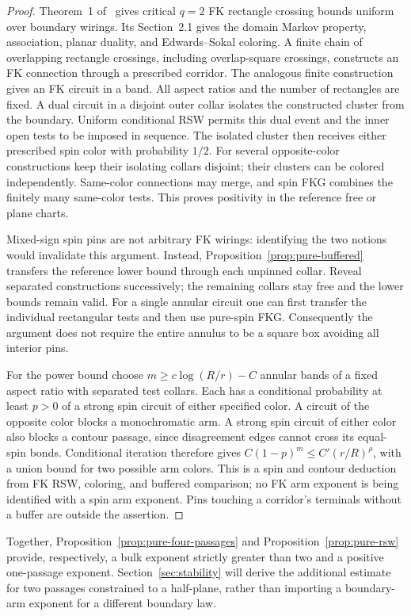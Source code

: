 \begin{proof}
Theorem~1 of~\cite{DHN2011} gives critical \(q=2\) FK rectangle
crossing bounds uniform over boundary wirings. Its Section~2.1 gives
the domain Markov property, association, planar duality, and
Edwards--Sokal coloring. A finite chain of overlapping rectangle
crossings, including overlap-square crossings, constructs an FK
connection through a prescribed corridor. The analogous finite
construction gives an FK circuit in a band. All aspect ratios and
the number of rectangles are fixed. A dual circuit in a disjoint
outer collar isolates the constructed cluster from the boundary.
Uniform conditional RSW permits this dual event and the inner open
tests to be imposed in sequence. The isolated cluster then receives
either prescribed spin color with probability \(1/2\). For several
opposite-color constructions keep their isolating collars disjoint;
their clusters can be colored independently. Same-color connections
may merge, and spin FKG combines the finitely many same-color tests.
This proves positivity in the reference free or plane charts.

Mixed-sign spin pins are not arbitrary FK wirings: identifying the
two notions would invalidate this argument. Instead,
Proposition~\ref{prop:pure-buffered} transfers the reference lower
bound through each unpinned collar. Reveal separated constructions
successively; the remaining collars stay free and the lower bounds
remain valid. For a single annular circuit one can first transfer the
individual rectangular tests and then use pure-spin FKG. Consequently
the argument does not require the entire annulus to be a square box
avoiding all interior pins.

For the power bound choose \(m\ge c\log(R/r)-C\) annular bands of
a fixed aspect ratio with separated test collars. Each has a
conditional probability at least \(p>0\) of a strong spin circuit
of either specified color. A circuit of the opposite color blocks a
monochromatic arm. A strong spin circuit of either color also blocks
a contour passage, since disagreement edges cannot cross its
equal-spin bonds. Conditional iteration therefore gives
\(C(1-p)^m\le C'(r/R)^\rho\), with a union bound for two possible
arm colors. This is a spin and contour deduction from FK RSW,
coloring, and buffered comparison; no FK arm exponent is being
identified with a spin arm exponent. Pins touching a corridor's
terminals without a buffer are outside the assertion.
\end{proof}

Together, Proposition~\ref{prop:pure-four-passages} and
Proposition~\ref{prop:pure-rsw} provide, respectively, a bulk exponent
strictly greater than two and a positive one-passage exponent.
Section~\ref{sec:stability} will derive the additional estimate for
two passages constrained to a half-plane, rather than importing a
boundary-arm exponent for a different boundary law.
